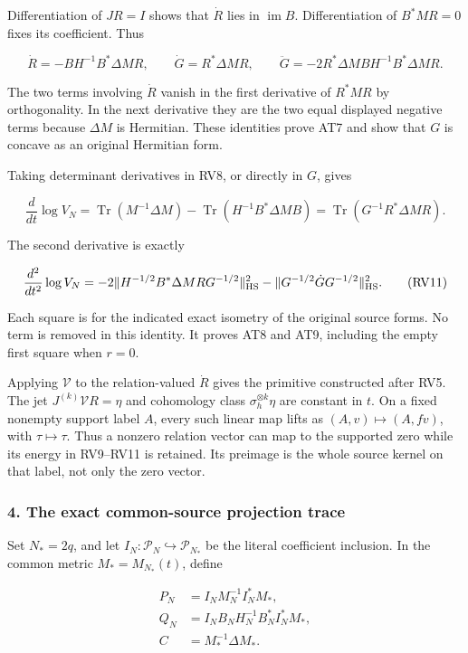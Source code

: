 \documentclass{article}
\begin{document}
Differentiation of \(JR=I\) shows that \(\dot R\) lies in \(\operatorname{im}B\). Differentiation of \(B^*MR=0\) fixes its coefficient. Thus

\[
\dot R=-BH^{-1}B^*\Delta M R,\qquad
\dot G=R^*\Delta M R,\qquad
\ddot G=-2R^*\Delta M BH^{-1}B^*\Delta M R.
\tag{RV9}
\]

The two terms involving \(\dot R\) vanish in the first derivative of \(R^*MR\) by orthogonality. In the next derivative they are the two equal displayed negative terms because \(\Delta M\) is Hermitian. These identities prove AT7 and show that \(G\) is concave as an original Hermitian form.

Taking determinant derivatives in RV8, or directly in \(G\), gives

\[
\frac d{dt}\log V_N
=\operatorname{Tr}(M^{-1}\Delta M)
-\operatorname{Tr}(H^{-1}B^*\Delta MB)
=\operatorname{Tr}(G^{-1}R^*\Delta MR).
\tag{RV10}
\]

The second derivative is exactly

\[
\frac {d^2}{dt^2}\log V_N
=-2\|H^{-1/2}B^*\Delta MR G^{-1/2}\|_{\rm HS}^2
-\|G^{-1/2}\dot G G^{-1/2}\|_{\rm HS}^2.
\tag{RV11}
\]

Each square is for the indicated exact isometry of the original source forms. No term is removed in this identity. It proves AT8 and AT9, including the empty first square when \(r=0\).

Applying \(\mathcal V\) to the relation-valued \(\dot R\) gives the primitive constructed after RV5. The jet \(J^{(k)}\mathcal V R=\eta\) and cohomology class \(\sigma_h^{\otimes k}\eta\) are constant in \(t\). On a fixed nonempty support label \(A\), every such linear map lifts as \((A,v)\mapsto(A,fv)\), with \(\tau\mapsto\tau\). Thus a nonzero relation vector can map to the supported zero while its energy in RV9--RV11 is retained. Its preimage is the whole source kernel on that label, not only the zero vector.

\subsubsection{4. The exact common-source projection trace}\label{endpoint-determinant_review--the-exact-common-source-projection-trace}

Set \(N_*=2q\), and let \(I_N:\mathcal P_N\hookrightarrow\mathcal P_{N_*}\) be the literal coefficient inclusion. In the common metric \(M_*=M_{N_*}(t)\), define

\[
\begin{aligned}
P_N&=I_NM_N^{-1}I_N^*M_*,\\
Q_N&=I_NB_NH_N^{-1}B_N^*I_N^*M_*,\\
C&=M_*^{-1}\Delta M_*.
\end{aligned}
\tag{RV12}
\]
\end{document}
